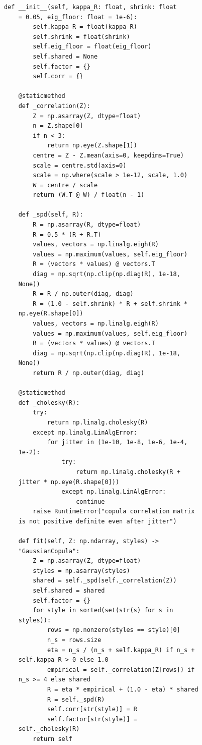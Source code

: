 \begin{multicols}{2}
\begin{Verbatim}[fontsize=\scriptsize]
    def __init__(self, kappa_R: float, shrink: float
    = 0.05, eig_floor: float = 1e-6):
        self.kappa_R = float(kappa_R)
        self.shrink = float(shrink)
        self.eig_floor = float(eig_floor)
        self.shared = None
        self.factor = {}
        self.corr = {}

    @staticmethod
    def _correlation(Z):
        Z = np.asarray(Z, dtype=float)
        n = Z.shape[0]
        if n < 3:
            return np.eye(Z.shape[1])
        centre = Z - Z.mean(axis=0, keepdims=True)
        scale = centre.std(axis=0)
        scale = np.where(scale > 1e-12, scale, 1.0)
        W = centre / scale
        return (W.T @ W) / float(n - 1)

    def _spd(self, R):
        R = np.asarray(R, dtype=float)
        R = 0.5 * (R + R.T)
        values, vectors = np.linalg.eigh(R)
        values = np.maximum(values, self.eig_floor)
        R = (vectors * values) @ vectors.T
        diag = np.sqrt(np.clip(np.diag(R), 1e-18,
    None))
        R = R / np.outer(diag, diag)
        R = (1.0 - self.shrink) * R + self.shrink *
    np.eye(R.shape[0])
        values, vectors = np.linalg.eigh(R)
        values = np.maximum(values, self.eig_floor)
        R = (vectors * values) @ vectors.T
        diag = np.sqrt(np.clip(np.diag(R), 1e-18,
    None))
        return R / np.outer(diag, diag)

    @staticmethod
    def _cholesky(R):
        try:
            return np.linalg.cholesky(R)
        except np.linalg.LinAlgError:
            for jitter in (1e-10, 1e-8, 1e-6, 1e-4,
    1e-2):
                try:
                    return np.linalg.cholesky(R +
    jitter * np.eye(R.shape[0]))
                except np.linalg.LinAlgError:
                    continue
        raise RuntimeError("copula correlation matrix
    is not positive definite even after jitter")

    def fit(self, Z: np.ndarray, styles) ->
    "GaussianCopula":
        Z = np.asarray(Z, dtype=float)
        styles = np.asarray(styles)
        shared = self._spd(self._correlation(Z))
        self.shared = shared
        self.factor = {}
        for style in sorted(set(str(s) for s in
    styles)):
            rows = np.nonzero(styles == style)[0]
            n_s = rows.size
            eta = n_s / (n_s + self.kappa_R) if n_s +
    self.kappa_R > 0 else 1.0
            empirical = self._correlation(Z[rows]) if
    n_s >= 4 else shared
            R = eta * empirical + (1.0 - eta) * shared
            R = self._spd(R)
            self.corr[str(style)] = R
            self.factor[str(style)] =
    self._cholesky(R)
        return self


\end{Verbatim}
\end{multicols}
